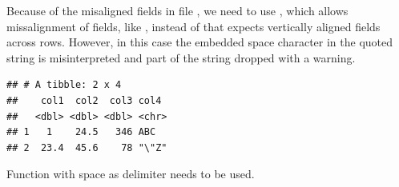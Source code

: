 \documentclass[krantz2]{krantz}\usepackage{knitr}%
\begin{document}
Because of the misaligned fields in file , we need to use , which allows missalignment of fields, like , instead of  that expects vertically aligned fields across rows. However, in this case the embedded space character in the quoted string is misinterpreted and part of the string dropped with a warning.

\begin{knitrout}\footnotesize
{}\color{fgcolor}\begin{kframe}
\begin{alltt}
\hlstd{(} \hlstd{=} \hlstd{)}
\end{alltt}


{\ttfamily\noindent\itshape\color{messagecolor}{\#\# Parsed with column specification:\\\#\# cols(\\\#\#\ \  col1 = col\_double(),\\\#\#\ \  col2 = col\_double(),\\\#\#\ \  col3 = col\_double(),\\\#\#\ \  col4 = col\_character()\\\#\# )}}

{\ttfamily\noindent\color{warningcolor}{\#\# Warning: 1 parsing failure.\\\#\# row col\ \ expected\ \ \ \ actual\ \ \ \ \ \ \ \ \ \ \ \ \ \ \ \ \ \ \ \ \ \ \ \ \ \ \ \ file\\\#\#\ \  2\ \ -- 4 columns 5 columns 'extdata/not-aligned-ASCII.txt'}}\begin{verbatim}
## # A tibble: 2 x 4
##    col1  col2  col3 col4 
##   <dbl> <dbl> <dbl> <chr>
## 1   1    24.5   346 ABC  
## 2  23.4  45.6    78 "\"Z"
\end{verbatim}
\end{kframe}
\end{knitrout}

Function  with space as delimiter needs to be used.
\end{document}
